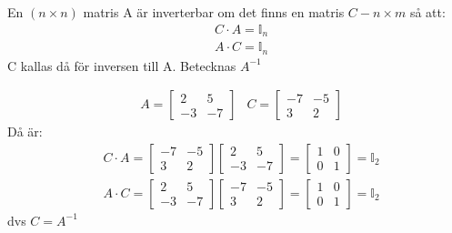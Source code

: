 \begin{Def}
    En $(n \times n)$ matris A är inverterbar om det finns en matris $C-{n \times m}$ så att:
    \begin{align*}
    &C \cdot A = \mathbb{I}_n \\ &A \cdot C = \mathbb{I}_n
    \end{align*}
    C kallas då för inversen till A. Betecknas $A^{-1}$
\end{Def}
\newpage
\begin{Ex}
    \begin{align*}
    &A = \begin{bmatrix} 2&5\\-3&-7 \end{bmatrix} &C = \begin{bmatrix} -7&-5\\3&2 \end{bmatrix}
    \end{align*}
    Då är:
    \begin{align*}
    &C \cdot A = \begin{bmatrix} -7&-5\\3&2 \end{bmatrix} \begin{bmatrix} 2&5\\-3&-7 \end{bmatrix} = \begin{bmatrix} 1&0\\0&1 \end{bmatrix} = \mathbb{I}_2\\
    &A \cdot C = \begin{bmatrix} 2&5\\-3&-7 \end{bmatrix} \begin{bmatrix} -7&-5\\3&2 \end{bmatrix} = \begin{bmatrix} 1&0\\0&1 \end{bmatrix} = \mathbb{I}_2
    \end{align*}
    dvs $C = A^{-1}$
\end{Ex}

